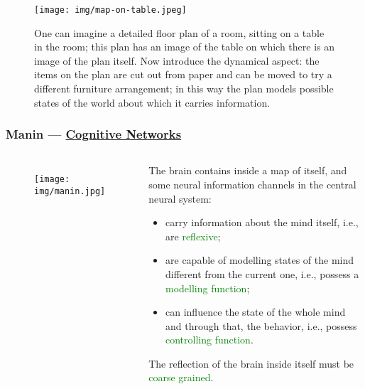 \documentclass[UTF8,11pt,colorlinks,compress,openany]{beamer}%
\begin{document}
\begin{frame}\frametitle{}
\begin{figure}
\texttt{[image: img/map-on-table.jpeg]}\caption{One can imagine a detailed floor plan of a room, sitting on a table in the room; this plan has an image of the table on which there is an image of the plan itself. Now introduce the dynamical aspect: the items on the plan are cut out from paper and can be moved to try a different furniture arrangement; in this way the plan models possible states of the world about which it carries information.}
\end{figure}
\end{frame}

\begin{frame}\frametitle{Manin --- \href{https://arxiv.org/abs/1709.03114}{Cognitive Networks}}
\begin{columns}
\begin{figure}[H]
\texttt{[image: img/manin.jpg]}
\end{figure}
\begin{block}{}
The brain contains inside a map of itself, and some neural information channels in the central neural system:
\begin{itemize}
	\item carry information about the mind itself, i.e., are \textcolor{green}{reflexive};
	\item are capable of modelling states of the mind different from the current one, i.e., possess a \textcolor{green}{modelling function};
	\item can influence the state of the whole mind and through that, the behavior, i.e., possess \textcolor{green}{controlling function}.
\end{itemize}
The reflection of the brain inside itself must be \textcolor{green}{coarse grained}.
\end{block}
\end{columns}
\end{frame}
\end{document}
